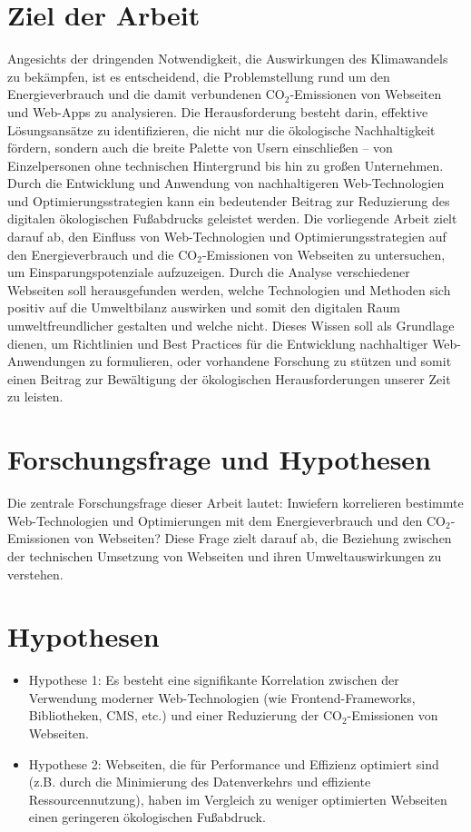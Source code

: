 \documentclass[Bachelor,BIF,german,IEEE]{BASE/twbook}
\begin{document}
\section{Ziel der Arbeit}
\noindent Angesichts der dringenden Notwendigkeit, die Auswirkungen des Klimawandels zu bekämpfen, ist es entscheidend, die Problemstellung rund um den Energieverbrauch und die damit verbundenen CO$_2$-Emissionen von Webseiten und Web-Apps zu analysieren. Die Herausforderung besteht darin, effektive Lösungsansätze zu identifizieren, die nicht nur die ökologische Nachhaltigkeit fördern, sondern auch die breite Palette von Usern einschließen – von Einzelpersonen ohne technischen Hintergrund bis hin zu großen Unternehmen. Durch die Entwicklung und Anwendung von nachhaltigeren Web-Technologien und Optimierungsstrategien  \cite{GSF24} kann ein bedeutender Beitrag zur Reduzierung des digitalen ökologischen Fußabdrucks geleistet werden.
Die vorliegende Arbeit zielt darauf ab, den Einfluss von Web-Technologien und Optimierungsstrategien auf den Energieverbrauch und die CO$_2$-Emissionen von Webseiten zu untersuchen, um Einsparungspotenziale aufzuzeigen.
Durch die Analyse verschiedener Webseiten soll herausgefunden werden, welche Technologien und Methoden sich positiv auf die Umweltbilanz auswirken und somit den digitalen Raum umweltfreundlicher gestalten und welche nicht.
Dieses Wissen soll als Grundlage dienen, um Richtlinien und Best Practices für die Entwicklung nachhaltiger Web-Anwendungen zu formulieren, oder vorhandene Forschung zu stützen und somit einen Beitrag zur Bewältigung der ökologischen Herausforderungen unserer Zeit zu leisten.

\section{Forschungsfrage und Hypothesen}
Die zentrale Forschungsfrage dieser Arbeit lautet: \glqq Inwiefern korrelieren bestimmte Web-Technologien und Optimierungen mit dem Energieverbrauch und den CO$_2$-Emissionen von Webseiten?\grqq{} Diese Frage zielt darauf ab, die Beziehung zwischen der technischen Umsetzung von Webseiten und ihren Umweltauswirkungen zu verstehen.\newline

\section{Hypothesen}
\begin{itemize}
    \item Hypothese 1: Es besteht eine signifikante Korrelation zwischen der Verwendung moderner Web-Technologien (wie Frontend-Frameworks, Bibliotheken, \ac{CMS}, etc.) und einer Reduzierung der CO$_2$-Emissionen von Webseiten.
    \item Hypothese 2: Webseiten, die für Performance und Effizienz optimiert sind (z.B. durch die Minimierung des Datenverkehrs und effiziente Ressourcennutzung), haben im Vergleich zu weniger optimierten Webseiten einen geringeren ökologischen Fußabdruck.
\end{itemize}
\end{document}
